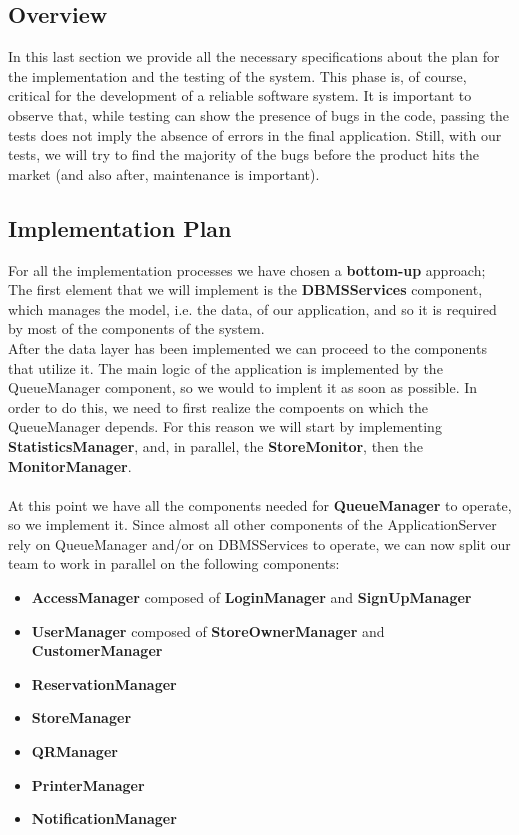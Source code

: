 \subsection{Overview}
In this last section we provide all the necessary specifications about the plan for the implementation and the testing of the system. This phase is, of course, critical for the development of a reliable software system. It is important to observe that, while testing can show the presence of bugs in the code, passing the tests does not imply the absence of errors in the final application. Still, with our tests, we will try to find the majority of the bugs before the product hits the market (and also after, maintenance is important).

\subsection{Implementation Plan}
For all the implementation processes we have chosen a \textbf{bottom-up} approach; %
\\
The first element that we will implement is the \textbf{DBMSServices} component, which manages the model, i.e. the data, of our application, and so it is required by most of the components of the system.\\
After the data layer has been implemented we can proceed to the components that utilize it. The main logic of the application is implemented by the QueueManager component, so we would to implent it as soon as possible. In order to do this, we need to first realize the compoents on which the QueueManager depends. For this reason we will start by implementing \textbf{StatisticsManager}, and, in parallel, the \textbf{StoreMonitor}, then the \textbf{MonitorManager}.\\\\
At this point we have all the components needed for \textbf{QueueManager} to operate, so we implement it. Since almost all other components of the ApplicationServer rely on QueueManager and/or on DBMSServices to operate, we can now split our team to work in parallel on the following components: 
\begin{itemize}
	\item \textbf{AccessManager} composed of \textbf{LoginManager} and \textbf{SignUpManager}
	\item \textbf{UserManager} composed of \textbf{StoreOwnerManager} and \textbf{CustomerManager}
	\item \textbf{ReservationManager}
	\item \textbf{StoreManager}
	\item \textbf{QRManager}
	\item \textbf{PrinterManager}
	\item \textbf{NotificationManager}
\end{itemize}
